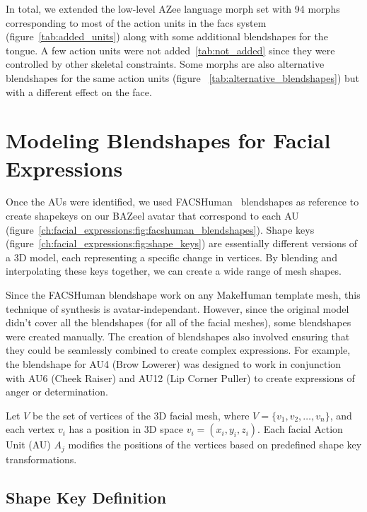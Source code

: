 \documentclass[../../main]{subfiles}
\begin{document}
In total, we extended the low-level AZee language morph set with 94 morphs corresponding to most of the action units in the \gls{facs} system (figure~\ref{tab:added_units}) along with some additional blendshapes for the tongue. A few action units were not added~\ref{tab:not_added} since they were controlled by other skeletal constraints. Some morphs are also alternative blendshapes for the same action units (figure ~\ref{tab:alternative_blendshapes}) but with a different effect on the face.

\section{Modeling Blendshapes for Facial Expressions}
\label{ch:facial_expressions:blendshape_creation}

Once the AUs were identified, we used FACSHuman~\cite{gilbert2021facshuman} blendshapes as reference to create shapekeys on our BAZeel avatar that correspond to each AU (figure~\ref{ch:facial_expressions:fig:facshuman_blendshapes}). Shape keys (figure~\ref{ch:facial_expressions:fig:shape_keys}) are essentially different versions of a 3D model, each representing a specific change in vertices. By blending and interpolating these keys together, we can create a wide range of mesh shapes.

Since the FACSHuman blendshape work on any MakeHuman template mesh, this technique of synthesis is avatar-independant. However, since the original model didn't cover all the blendshapes (for all of the facial meshes), some blendshapes were created manually. The creation of blendshapes also involved ensuring that they could be seamlessly combined to create complex expressions. For example, the blendshape for AU4 (Brow Lowerer) was designed to work in conjunction with AU6 (Cheek Raiser) and AU12 (Lip Corner Puller) to create expressions of anger or determination.

Let \( V \) be the set of vertices of the 3D facial mesh, where \( V = \{ v_1, v_2, \dots, v_n \} \), and each vertex \( v_i \) has a position in 3D space \( v_i = (x_i, y_i, z_i) \). Each facial Action Unit (AU) \( A_j \) modifies the positions of the vertices based on predefined shape key transformations.

\subsection{Shape Key Definition}
\label{ch:facial_expressions:blendshape_creation:shape_key_definition}
\end{document}
